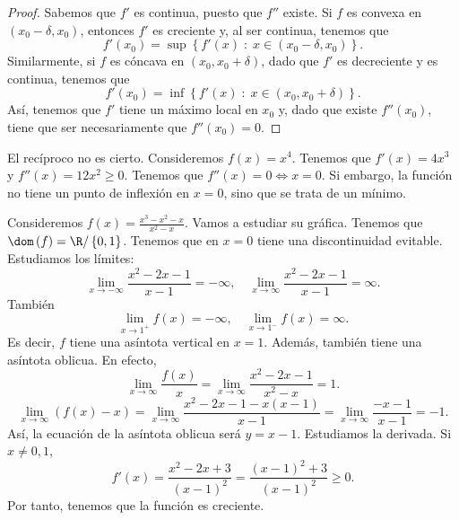 \begin{proof}
Sabemos que $\displaystyle f' $ es continua, puesto que $\displaystyle f'' $ existe. Si $\displaystyle f $ es convexa en $\displaystyle \left(x_{0}-\delta, x_{0}\right) $, entonces $\displaystyle f' $ es creciente y, al ser continua, tenemos que 
\[ f'\left(x_{0}\right) = \sup \left\{ f'\left(x\right) \; : \; x \in \left(x_{0}-\delta, x_{0} \right)\right\}  .\]
Similarmente, si $\displaystyle f $ es cóncava en $\displaystyle \left(x_{0}, x_{0} + \delta \right) $, dado que $\displaystyle f' $ es decreciente y es continua, tenemos que 
\[ f'\left(x_{0}\right) = \inf \left\{ f'\left(x\right) \; : \; x \in \left(x_{0}, x_{0} + \delta \right)\right\}  .\]
Así, tenemos que $\displaystyle f' $ tiene un máximo local en $\displaystyle x_{0} $ y, dado que existe $\displaystyle f''\left(x_{0}\right) $, tiene que ser necesariamente que $\displaystyle f''\left(x_{0}\right) =0 $.
\end{proof}
\begin{eg}
\normalfont El recíproco no es cierto. Consideremos $\displaystyle f\left(x\right) = x^{4} $. Tenemos que $\displaystyle f'\left(x\right) = 4x^{3} $ y $\displaystyle f''\left(x\right) = 12x^{2} \geq 0 $. Tenemos que $\displaystyle f''\left(x\right) = 0 \iff x = 0 $. Si embargo, la función no tiene un punto de inflexión en $\displaystyle x = 0 $, sino que se trata de un mínimo.
\end{eg}
\begin{eg}
	\normalfont Consideremos $\displaystyle f\left(x\right) = \frac{x^{3}-x^{2}-x}{x^{2}-x} $. Vamos a estudiar su gráfica. Tenemos que $\displaystyle \dom\left(f\right) = \R / \left\{ 0,1\right\}  $. Tenemos que en $\displaystyle x = 0 $ tiene una discontinuidad evitable. Estudiamos los límites:
	\[ \lim_{x \to -\infty}\frac{x^{2}-2x-1}{x-1} = - \infty, \quad \lim_{x \to \infty}\frac{x^{2}-2x-1}{x-1} = \infty .\]
	También 
	\[\lim_{x \to 1^{+}}f\left(x\right) = - \infty, \quad \lim_{x \to 1^{-}}f\left(x\right) = \infty .\]
	Es decir, $\displaystyle f $ tiene una asíntota vertical en $\displaystyle x = 1 $. Además, también tiene una asíntota oblicua. En efecto,
	\[ \lim_{x \to \infty} \frac{f\left(x\right)}{x} = \lim_{x \to \infty}\frac{x^{2}-2x-1}{x^{2}-x} = 1  .\]
\[ \lim_{x \to \infty}\left(f\left(x\right)-x\right) = \lim_{x \to \infty}\frac{x^{2}-2x-1-x\left(x-1\right)}{x-1} = \lim_{x \to \infty} \frac{-x -1}{x-1} = -1.\]
Así, la ecuación de la asíntota oblicua será $\displaystyle y = x -1 $.
	Estudiamos la derivada. Si $\displaystyle x \neq 0, 1 $,
\[ f'\left(x\right)= \frac{x^{2}-2x+3}{\left(x-1\right)^{2}} = \frac{\left(x-1\right)^{2}+3}{\left(x-1\right)^{2}}\geq 0.\]
Por tanto, tenemos que la función es creciente.
\end{eg}

